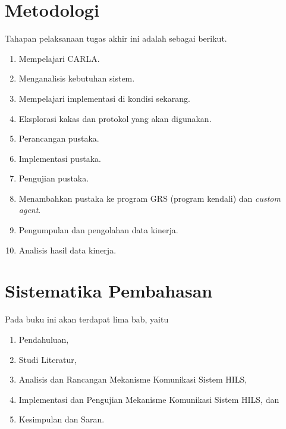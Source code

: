 \section{Metodologi}


Tahapan pelaksanaan tugas akhir ini adalah sebagai berikut.

\begin{enumerate}
	\item Mempelajari CARLA.
	\item Menganalisis kebutuhan sistem.
	\item Mempelajari implementasi di kondisi sekarang.
	\item Eksplorasi kakas dan protokol yang akan digunakan.
	\item Perancangan pustaka.
	\item Implementasi pustaka.
	\item Pengujian pustaka.
	\item Menambahkan pustaka ke program GRS (program kendali) dan
		\textit{custom agent}.
	\item Pengumpulan dan pengolahan data kinerja.
	\item Analisis hasil data kinerja.
\end{enumerate}

\section{Sistematika Pembahasan}


Pada buku ini akan terdapat lima bab, yaitu
\begin{enumerate}
	\item Pendahuluan,
	\item Studi Literatur,
	\item Analisis dan Rancangan Mekanisme Komunikasi Sistem HILS,
	\item Implementasi dan Pengujian Mekanisme Komunikasi Sistem HILS, dan
	\item Kesimpulan dan Saran.
\end{enumerate}

